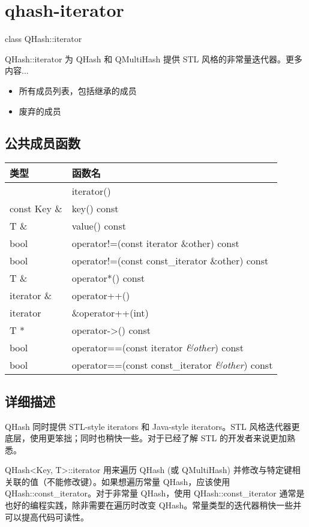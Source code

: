 \chapter{qhash-iterator}

class QHash::iterator

QHash::iterator 为 QHash 和 QMultiHash 提供 STL 风格的非常量迭代器。更多内容...


\begin{itemize}
\item 所有成员列表，包括继承的成员
\item 废弃的成员
\end{itemize}

\splitLine

\section{公共成员函数}

\begin{tabular}{|l|l|}
\hline
类型	&函数名\\
\hline
& iterator()\\
\hline
const Key \& &	key() const\\
\hline
T \& &	value() const\\
\hline
bool	& operator!=(const iterator \&other) const\\
\hline
bool	& operator!=(const const\_iterator \&other) const\\
\hline
T \& & 	operator*() const\\
\hline
iterator \&	&operator++()\\
\hline
iterator	&\&operator++(int)\\
\hline
T *	& operator->() const\\
\hline
bool&	operator==(const iterator \emph{\&other}) const\\
\hline
bool&	operator==(const const\_iterator \emph{\&other}) const\\
\hline
\end{tabular}


\splitLine

\section{详细描述}

QHash 同时提供 STL-style iterators 和 Java-style iterators。STL 风格迭代器更底层，使用更笨拙；同时也稍快一些。对于已经了解 STL 的开发者来说更加熟悉。

QHash<Key, T>::iterator 用来遍历 QHash (或 QMultiHash) 并修改与特定键相关联的值（不能修改键）。如果想遍历常量 QHash，应该使用 QHash::const\_iterator。对于非常量 QHash，使用 QHash::const\_iterator 通常是也好的编程实践，除非需要在遍历时改变 QHash。常量类型的迭代器稍快一些并可以提高代码可读性。

